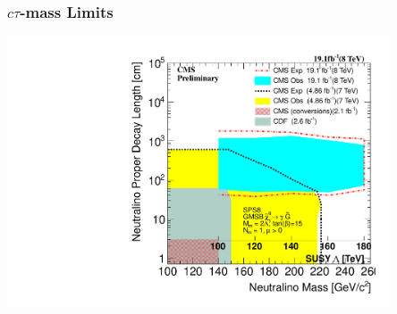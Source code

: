 \documentclass{beamer}
\begin{document}
\begin{frame}
\frametitle{$c\tau$-mass Limits}
 \begin{minipage}[t]{0.8\linewidth}
      \includegraphics[height= 8cm,width=0.8\paperwidth]{THESISPLOTS/Neutralino_Ctau-Vs-Lambda_2D_exclusion.pdf}
 \end{minipage}
\end{frame}
\end{document}
